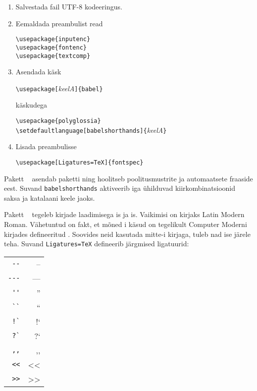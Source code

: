 \begin{enumerate}
  \item Salvestada fail UTF-8 kodeeringus.
  \item Eemaldada preambulist read
\begin{lscommand}
\verb|\usepackage{inputenc}|\\
\verb|\usepackage{fontenc}|\\
\verb|\usepackage{textcomp}|
\end{lscommand}
  \item Asendada käsk
\begin{lscommand}
\verb|\usepackage[|\emph{keelA}\verb|]{babel}|
\end{lscommand}
käskudega
\begin{lscommand}
\verb|\usepackage{polyglossia}|\\
\verb|\setdefaultlanguage[babelshorthands]{|\emph{keelA}\verb|}|
\end{lscommand}
  \item Lisada preambulisse
\begin{lscommand}
\verb|\usepackage[Ligatures=TeX]{fontspec}|
\end{lscommand}
\end{enumerate}

Pakett ~\cite{polyglossia} asendab paketti 
ning hoolitseb poolitusmustrite ja automaatsete fraaside eest. Suvand
\verb|babelshorthands| aktiveerib iga ühilduvad
kiirkombinatsioonid saksa ja katalaani keele jaoks.

Pakett ~\cite{fontspec} tegeleb kirjade laadimisega
is ja is. Vaikimisi on kirjaks Latin
Modern Roman. Vähetuntud on fakt, et mõned i käsud on
tegelikult Computer Moderni kirjades
defineeritud . Soovides neid kasutada mitte-i
kirjaga, tuleb nad ise järele teha. Suvand \texttt{Ligatures=TeX}
defineerib järgmised ligatuurid:

\begin{tabular}{rr}
\verb|--|	& --\\
\verb|---|	& ---\\
\verb|''|	& ''\\
\verb|``|	& ``\\
\verb|!`|	& !`\\
\verb|?`|	& ?`\\
\verb|,,|	& ,,\\
\verb|<<|	& <<\\
\verb|>>|	& >>\\
\end{tabular}

